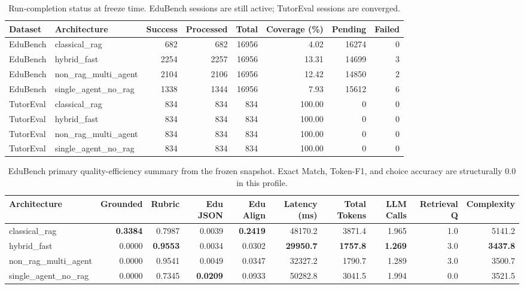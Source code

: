 
\begin{table}[t]
\caption{Run-completion status at freeze time. EduBench sessions are still active; TutorEval sessions are converged.}
\label{tab:run_completion_snapshot}
\centering
\footnotesize
\begin{tabular}{llrrrrrr}
\toprule
Dataset & Architecture & Success & Processed & Total & Coverage (\%) & Pending & Failed \\
\midrule
EduBench & classical\_rag & 682 & 682 & 16956 & 4.02 & 16274 & 0 \\
EduBench & hybrid\_fast & 2254 & 2257 & 16956 & 13.31 & 14699 & 3 \\
EduBench & non\_rag\_multi\_agent & 2104 & 2106 & 16956 & 12.42 & 14850 & 2 \\
EduBench & single\_agent\_no\_rag & 1338 & 1344 & 16956 & 7.93 & 15612 & 6 \\
TutorEval & classical\_rag & 834 & 834 & 834 & 100.00 & 0 & 0 \\
TutorEval & hybrid\_fast & 834 & 834 & 834 & 100.00 & 0 & 0 \\
TutorEval & non\_rag\_multi\_agent & 834 & 834 & 834 & 100.00 & 0 & 0 \\
TutorEval & single\_agent\_no\_rag & 834 & 834 & 834 & 100.00 & 0 & 0 \\
\bottomrule
\end{tabular}
\end{table}

\begin{table}[t]
\caption{EduBench primary quality-efficiency summary from the frozen snapshot. Exact Match, Token-F1, and choice accuracy are structurally 0.0 in this profile.}
\label{tab:edubench_summary}
\centering
\footnotesize
\begin{tabular}{lrrrrrrrrr}
\toprule
Architecture & Grounded & Rubric & Edu JSON & Edu Align & Latency (ms) & Total Tokens & LLM Calls & Retrieval Q & Complexity \\
\midrule
classical\_rag & \textbf{0.3384} & 0.7987 & 0.0039 & \textbf{0.2419} & 48170.2 & 3871.4 & 1.965 & 1.0 & 5141.2 \\
hybrid\_fast & 0.0000 & \textbf{0.9553} & 0.0034 & 0.0302 & \textbf{29950.7} & \textbf{1757.8} & \textbf{1.269} & 3.0 & \textbf{3437.8} \\
non\_rag\_multi\_agent & 0.0000 & 0.9541 & 0.0049 & 0.0347 & 32327.2 & 1790.7 & 1.289 & 3.0 & 3500.7 \\
single\_agent\_no\_rag & 0.0000 & 0.7345 & \textbf{0.0209} & 0.0933 & 50282.8 & 3041.5 & 1.994 & 0.0 & 3521.5 \\
\bottomrule
\end{tabular}
\end{table}

